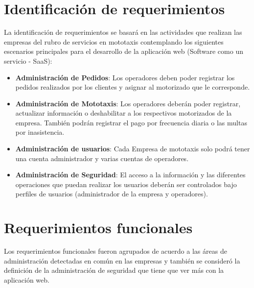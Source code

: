 \section{Identificación de requerimientos}
\noindent La identificación de requerimientos se basará en las actividades que realizan las empresas del rubro de servicios en mototaxis contemplando los siguientes escenarios principales para el desarrollo de la aplicación web (Software como un servicio - SaaS):
\begin{itemize}
\item \textbf{Administración de Pedidos}: Los operadores deben poder registrar los pedidos realizados por los clientes y asignar al motorizado que le corresponde.
\item \textbf {Administración de Mototaxis}: Los operadores deberán poder registrar, actualizar información o deshabilitar a los respectivos motorizados de la empresa. También podrán registrar el pago por frecuencia diaria o las multas por inasistencia.  
\item \textbf{Administración de usuarios}: Cada Empresa de mototaxis solo podrá tener una cuenta administrador y  varias cuentas de operadores.
\item \textbf{Administración de Seguridad}: El acceso a la información y las diferentes operaciones que puedan realizar los usuarios deberán ser controlados bajo perfiles de usuarios (administrador de la empresa y operadores).
\end{itemize}

\section{Requerimientos funcionales}

\noindent Los requerimientos funcionales fueron agrupados de acuerdo a las áreas de administración detectadas en común en las empresas y también se consideró la definición de la administración de seguridad que tiene que ver más con la aplicación web.

